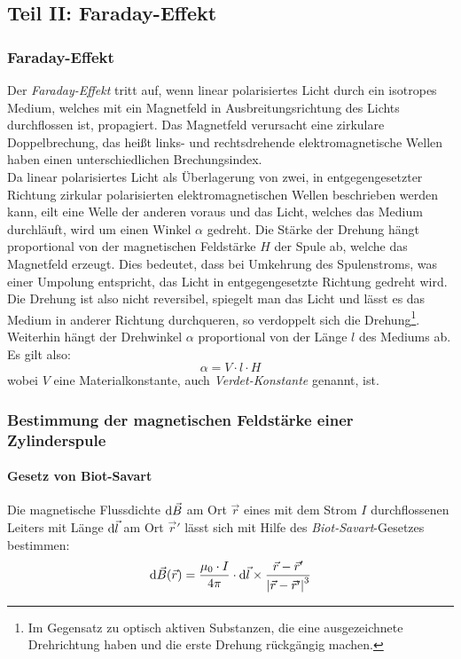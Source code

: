 \subsection{Teil II: Faraday-Effekt}
\subsubsection{Faraday-Effekt}
Der \emph{Faraday-Effekt} tritt auf, wenn linear polarisiertes Licht durch ein isotropes Medium, welches mit ein Magnetfeld in 
Ausbreitungsrichtung des Lichts durchflossen ist, propagiert. Das Magnetfeld verursacht eine zirkulare Doppelbrechung, das heißt links- und 
rechtsdrehende elektromagnetische Wellen haben einen unterschiedlichen Brechungsindex. \\
Da linear polarisiertes Licht als Überlagerung von zwei, in entgegengesetzter Richtung zirkular polarisierten elektromagnetischen Wellen 
beschrieben werden kann, eilt eine Welle der anderen voraus und das Licht, welches das Medium durchläuft, wird um einen Winkel $\alpha$ gedreht. 
Die Stärke der Drehung hängt proportional von der magnetischen Feldstärke $H$ der Spule ab, welche das Magnetfeld erzeugt. 
Dies bedeutet, dass bei Umkehrung des Spulenstroms, was einer Umpolung entspricht, das Licht in entgegengesetzte Richtung gedreht wird. 
Die Drehung ist also nicht reversibel, spiegelt man das Licht und lässt es das Medium in anderer Richtung durchqueren, 
so verdoppelt sich die Drehung\footnote{Im Gegensatz zu optisch aktiven Substanzen, die eine ausgezeichnete Drehrichtung haben 
und die erste Drehung rückgängig machen.}. Weiterhin hängt der Drehwinkel $\alpha$ proportional von der Länge $l$ des Mediums ab.
Es gilt also:
\begin{equation}
\label{eq:faraday}
  \alpha = V \cdot l \cdot H
\end{equation}
wobei $V$ eine Materialkonstante, auch \emph{Verdet-Konstante} genannt, ist.

\subsubsection{Bestimmung der magnetischen Feldstärke einer Zylinderspule}
\paragraph{Gesetz von Biot-Savart}
Die magnetische Flussdichte $\mathrm{d} \vec{B}$ am Ort $\vec{r}$ eines mit dem Strom $I$ durchflossenen Leiters mit Länge $\mathrm{d} \vec{l}$ 
am Ort $\vec{r}'$ lässt sich mit Hilfe des \emph{Biot-Savart}-Gesetzes bestimmen:
\begin{equation}
  \label{eq:biotsavart}
  \mathrm{d} \vec{B}(\vec{r}) = \frac{\mu_0 \cdot I}{4 \pi} \cdot \mathrm{d} \vec{l} \times \frac{\vec{r} - \vec{r}'}{\left|\vec{r} - \vec{r}'\right|^3}
\end{equation}
